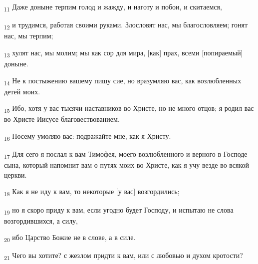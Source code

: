 \begin{tcolorbox}
\textsubscript{11} Даже доныне терпим голод и жажду, и наготу и побои, и скитаемся,
\end{tcolorbox}
\begin{tcolorbox}
\textsubscript{12} и трудимся, работая своими руками. Злословят нас, мы благословляем; гонят нас, мы терпим;
\end{tcolorbox}
\begin{tcolorbox}
\textsubscript{13} хулят нас, мы молим; мы как сор для мира, [как] прах, всеми [попираемый] доныне.
\end{tcolorbox}
\begin{tcolorbox}
\textsubscript{14} Не к постыжению вашему пишу сие, но вразумляю вас, как возлюбленных детей моих.
\end{tcolorbox}
\begin{tcolorbox}
\textsubscript{15} Ибо, хотя у вас тысячи наставников во Христе, но не много отцов; я родил вас во Христе Иисусе благовествованием.
\end{tcolorbox}
\begin{tcolorbox}
\textsubscript{16} Посему умоляю вас: подражайте мне, как я Христу.
\end{tcolorbox}
\begin{tcolorbox}
\textsubscript{17} Для сего я послал к вам Тимофея, моего возлюбленного и верного в Господе сына, который напомнит вам о путях моих во Христе, как я учу везде во всякой церкви.
\end{tcolorbox}
\begin{tcolorbox}
\textsubscript{18} Как я не иду к вам, то некоторые [у вас] возгордились;
\end{tcolorbox}
\begin{tcolorbox}
\textsubscript{19} но я скоро приду к вам, если угодно будет Господу, и испытаю не слова возгордившихся, а силу,
\end{tcolorbox}
\begin{tcolorbox}
\textsubscript{20} ибо Царство Божие не в слове, а в силе.
\end{tcolorbox}
\begin{tcolorbox}
\textsubscript{21} Чего вы хотите? с жезлом придти к вам, или с любовью и духом кротости?
\end{tcolorbox}
